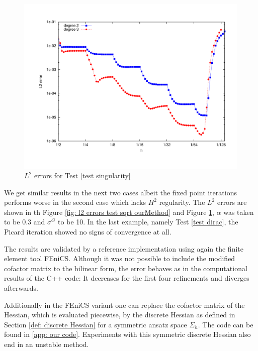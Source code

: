   
  \begin{figure}[H]
  	\centering
  	\includegraphics[scale =0.37]{plots/MA2.pdf}
  	\caption{$L^2$ errors for Test \ref{test singularity}}
  	\label{fig: l2 errors test singularity ourMethod}
  \end{figure}
We get similar results in the next two cases albeit the fixed point iterations performs worse in the second case which lacks $H^2$ regularity. The $L^2$ errors are shown in th Figure \ref{fig: l2 errors test sqrt ourMethod} and Figure \ref{fig: l2 errors test singularity ourMethod}, $\alpha$ was taken to be 0.3 and $\sigma^G$ to be 10. In the last example, namely Test \ref{test dirac}, the Picard iteration showed no signs of convergence at all.

The results are validated by a reference implementation using again the finite element tool FEniCS. Although it was not possible to include the modified cofactor matrix to the bilinear form, the error behaves as in the computational results of the C++ code: It decreases for the first four refinements and diverges afterwards. 

Additionally in the FEniCS variant one can replace the cofactor matrix of the Hessian, which is evaluated piecewise, by the discrete Hessian as defined in Section \ref{def: discrete Hessian} for a symmetric ansatz space $\Sigma_h$. The code can be found in \ref{app: our code}. Experiments with this symmetric discrete Hessian also end in an unstable method.
